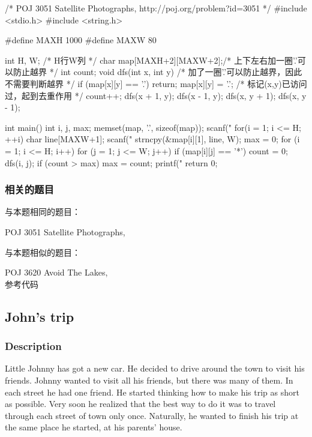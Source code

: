 \begin{Codex}[label=satellite_photographs.c]
    /* POJ 3051 Satellite Photographs, http://poj.org/problem?id=3051 */
    #include <stdio.h>
    #include <string.h>

    #define MAXH 1000
    #define MAXW 80

    int H, W; /* H行W列 */
    char map[MAXH+2][MAXW+2];/* 上下左右加一圈'.'可以防止越界 */
    int count;
    void dfs(int x, int y) {
        /* 加了一圈'.'可以防止越界，因此不需要判断越界 */
        if (map[x][y] == '.') return;
        map[x][y] = '.';  /* 标记(x,y)已访问过，起到去重作用 */
        count++;
        dfs(x + 1, y);
        dfs(x - 1, y);
        dfs(x, y + 1);
        dfs(x, y - 1);
    }

    int main() {
        int i, j, max;
        memset(map, '.', sizeof(map));
        scanf("%
        for(i = 1; i <= H; ++i) {
            char line[MAXW+1];
            scanf("%
            strncpy(&map[i][1], line, W);
        }
        max = 0;
        for (i = 1; i <= H; i++) {
            for (j = 1; j <= W; j++) {
                if (map[i][j] == '*') {
                    count = 0;
                    dfs(i, j);
                }
                if (count > max) max = count;
            }
        }
        printf("%
        return 0;
    }
\end{Codex}


\subsubsection{相关的题目}
与本题相同的题目：
\begindot
\item POJ 3051 Satellite Photographs, 
\myenddot

与本题相似的题目：
\begindot
\item POJ 3620 Avoid The Lakes,  \\ 参考代码 
\myenddot


\subsection{John's trip}


\subsubsection{Description}
Little Johnny has got a new car. He decided to drive around the town to visit his friends. Johnny wanted to visit all his friends, but there was many of them. In each street he had one friend. He started thinking how to make his trip as short as possible. Very soon he realized that the best way to do it was to travel through each street of town only once. Naturally, he wanted to finish his trip at the same place he started, at his parents' house.


